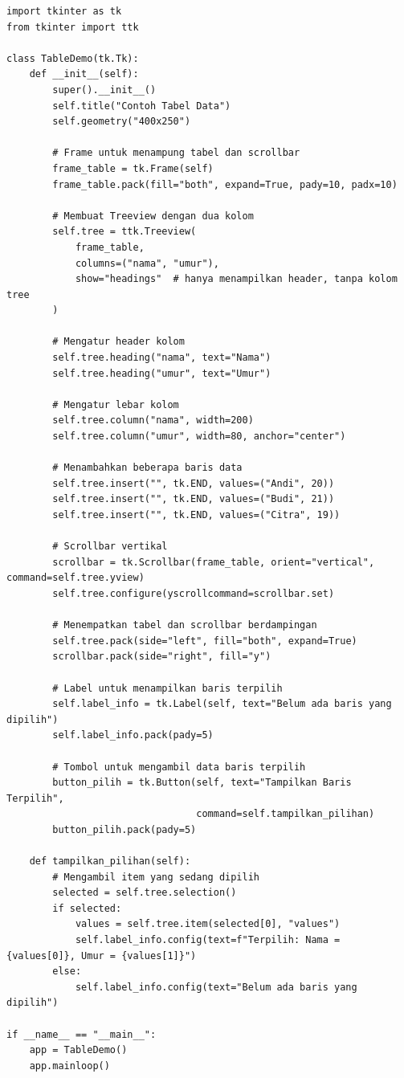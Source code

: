 \begin{lstlisting}[style=PythonStyle, caption={Contoh Tabel Data dengan ttk.Treeview}, label={lst:b12-tabel-data-dengan-ttk-treeview}]
import tkinter as tk
from tkinter import ttk

class TableDemo(tk.Tk):
    def __init__(self):
        super().__init__()
        self.title("Contoh Tabel Data")
        self.geometry("400x250")

        # Frame untuk menampung tabel dan scrollbar
        frame_table = tk.Frame(self)
        frame_table.pack(fill="both", expand=True, pady=10, padx=10)

        # Membuat Treeview dengan dua kolom
        self.tree = ttk.Treeview(
            frame_table,
            columns=("nama", "umur"),
            show="headings"  # hanya menampilkan header, tanpa kolom tree
        )

        # Mengatur header kolom
        self.tree.heading("nama", text="Nama")
        self.tree.heading("umur", text="Umur")

        # Mengatur lebar kolom
        self.tree.column("nama", width=200)
        self.tree.column("umur", width=80, anchor="center")

        # Menambahkan beberapa baris data
        self.tree.insert("", tk.END, values=("Andi", 20))
        self.tree.insert("", tk.END, values=("Budi", 21))
        self.tree.insert("", tk.END, values=("Citra", 19))

        # Scrollbar vertikal
        scrollbar = tk.Scrollbar(frame_table, orient="vertical", command=self.tree.yview)
        self.tree.configure(yscrollcommand=scrollbar.set)

        # Menempatkan tabel dan scrollbar berdampingan
        self.tree.pack(side="left", fill="both", expand=True)
        scrollbar.pack(side="right", fill="y")

        # Label untuk menampilkan baris terpilih
        self.label_info = tk.Label(self, text="Belum ada baris yang dipilih")
        self.label_info.pack(pady=5)

        # Tombol untuk mengambil data baris terpilih
        button_pilih = tk.Button(self, text="Tampilkan Baris Terpilih",
                                 command=self.tampilkan_pilihan)
        button_pilih.pack(pady=5)

    def tampilkan_pilihan(self):
        # Mengambil item yang sedang dipilih
        selected = self.tree.selection()
        if selected:
            values = self.tree.item(selected[0], "values")
            self.label_info.config(text=f"Terpilih: Nama = {values[0]}, Umur = {values[1]}")
        else:
            self.label_info.config(text="Belum ada baris yang dipilih")

if __name__ == "__main__":
    app = TableDemo()
    app.mainloop()
\end{lstlisting}


